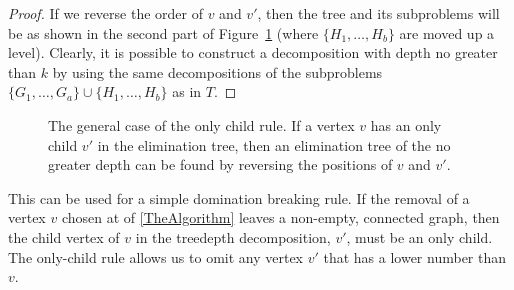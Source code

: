 {\begin{proof}
    If we reverse the order of $v$ and $v'$,
    then the tree and its subproblems will be as shown in the second part of Figure~\ref{fig:onlychildgeneral}
    (where $\{H_1, \dots, H_b\}$ are moved up a level).  Clearly, it is possible to construct a decomposition
    with depth no greater than $k$ by using the same decompositions of the
    subproblems $\{G_1, \dots, G_a\} \cup \{H_1, \dots, H_b\}$ as in $T$.
    \end{proof}

    \begin{figure}[htb]
      \centering
      \caption{The general case of the only child rule.  If a vertex
      $v$ has an only child $v'$ in the elimination tree, then an elimination
      tree of the no greater depth can be found by reversing the positions of $v$
      and $v'$.}
      \label{fig:onlychildgeneral}
    \end{figure}

    This can be used for a simple domination breaking rule.  If the removal of a vertex $v$ chosen at
     of \cref{TheAlgorithm} leaves a non-empty, connected graph, then the child
    vertex of $v$ in the treedepth decomposition, $v'$, must be an only child.  The only-child rule
    allows us to omit any vertex $v'$ that has a lower number than $v$.

}
